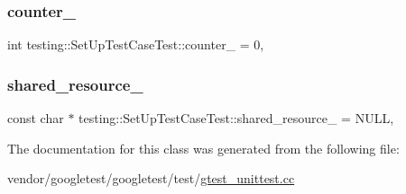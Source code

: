 \subsubsection{\texorpdfstring{counter\+\_\+}{counter\_}}
{\footnotesize\ttfamily int testing\+::\+Set\+Up\+Test\+Case\+Test\+::counter\+\_\+ = 0\hspace{0.3cm}{\ttfamily [static]}, {\ttfamily [protected]}}

\mbox{\label{classtesting_1_1_set_up_test_case_test_a904e77fd9a628b6a9aca0280665fd040}} 
\subsubsection{\texorpdfstring{shared\+\_\+resource\+\_\+}{shared\_resource\_}}
{\footnotesize\ttfamily const char $\ast$ testing\+::\+Set\+Up\+Test\+Case\+Test\+::shared\+\_\+resource\+\_\+ = N\+U\+LL\hspace{0.3cm}{\ttfamily [static]}, {\ttfamily [protected]}}



The documentation for this class was generated from the following file\+:\begin{DoxyCompactItemize}
\item 
vendor/googletest/googletest/test/\hyperlink{gtest__unittest_8cc}{gtest\+\_\+unittest.\+cc}\end{DoxyCompactItemize}
